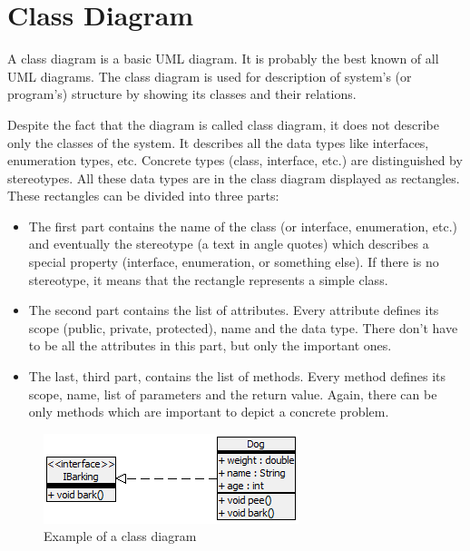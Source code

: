 
\chapter{Class Diagram}
\label{section:classDiagramDescription}

A class diagram is a basic UML diagram. It is probably the best known of all UML diagrams. The class diagram is used for description of system's (or program's) structure by showing its classes and their relations. 

Despite the fact that the diagram is called class diagram, it does not describe only the classes of the system. It describes all the data types like interfaces, enumeration types, etc. Concrete types (class, interface, etc.) are distinguished by stereotypes. All these data types are in the class diagram displayed as rectangles. These rectangles can be divided into three parts: 
\begin{itemize}
    \item The first part contains the name of the class (or interface, enumeration, etc.) and eventually the stereotype (a text in \guillemotleft angle quotes\guillemotright) which describes a special property (interface, enumeration, or something else). If there is no stereotype, it means that the rectangle represents a simple class.
    \item The second part contains the list of attributes. Every attribute defines its scope (public, private, protected), name and the data type. There don't have to be all the attributes in this part, but only the important ones.
    \item The last, third part, contains the list of methods. Every method defines its scope, name, list of parameters and the return value. Again, there can be only methods which are important to depict a concrete problem.
\end{itemize}

\begin{figure}[!ht]
\begin{center}
\includegraphics[]{img/classDiagramExample.png}
\caption{Example of a class diagram}
\label{f-classDiagramExample}
\end{center}
\end{figure}

